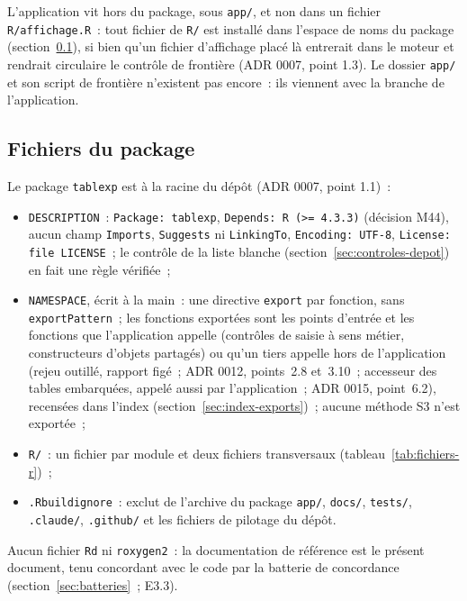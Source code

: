 \documentclass[a4paper,11pt]{article}
\newcommand{\code}[1]{\texttt{\small #1}}
\begin{document}
\medskip
L'application vit hors du package, sous \code{app/}, et non dans un fichier
\code{R/affichage.R}~: tout fichier de \code{R/} est installé dans l'espace de
noms du package (section~\ref{sec:fichiers-package}), si bien qu'un fichier
d'affichage placé là entrerait dans le moteur et rendrait circulaire le
contrôle de frontière (ADR 0007, point 1.3). Le dossier \code{app/} et son
script de frontière n'existent pas encore~: ils viennent avec la branche de
l'application.

\subsection{Fichiers du package}
\label{sec:fichiers-package}

Le package \code{tablexp} est à la racine du dépôt (ADR 0007, point 1.1)~:

\begin{itemize}[leftmargin=*, itemsep=2pt]
  \item \code{DESCRIPTION}~: \code{Package: tablexp}, \code{Depends: R (>= 4.3.3)}
    (décision M44), aucun champ \code{Imports}, \code{Suggests} ni
    \code{LinkingTo}, \code{Encoding: UTF-8}, \code{License: file LICENSE}~; le
    contrôle de la liste blanche (section~\ref{sec:controles-depot}) en fait une
    règle vérifiée~;
  \item \code{NAMESPACE}, écrit à la main~: une directive \code{export} par
    fonction, sans \code{exportPattern}~; les fonctions exportées sont les
    points d'entrée et les fonctions que l'application appelle (contrôles de
    saisie à sens métier, constructeurs d'objets partagés) ou qu'un tiers
    appelle hors de l'application (rejeu outillé, rapport figé~; ADR 0012,
    points~2.8 et~3.10~; accesseur des tables embarquées, appelé aussi par
    l'application~; ADR 0015, point~6.2), recensées dans
    l'index (section~\ref{sec:index-exports})~; aucune méthode S3 n'est
    exportée~;
  \item \code{R/}~: un fichier par module et deux fichiers transversaux
    (tableau~\ref{tab:fichiers-r})~;
  \item \code{.Rbuildignore}~: exclut de l'archive du package \code{app/},
    \code{docs/}, \code{tests/}, \code{.claude/}, \code{.github/} et les
    fichiers de pilotage du dépôt.
\end{itemize}

\noindent
Aucun fichier \code{Rd} ni \code{roxygen2}~: la documentation de référence est
le présent document, tenu concordant avec le code par la batterie de
concordance (section~\ref{sec:batteries}~; E3.3).
\end{document}

